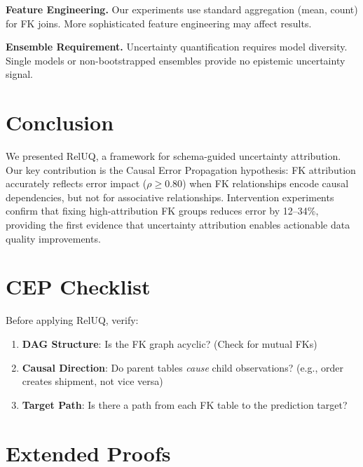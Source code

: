 \documentclass{article}
\begin{document}
\textbf{Feature Engineering.}
Our experiments use standard aggregation (mean, count) for FK joins. More sophisticated
feature engineering may affect results.

\textbf{Ensemble Requirement.}
Uncertainty quantification requires model diversity. Single models or non-bootstrapped
ensembles provide no epistemic uncertainty signal.

\section{Conclusion}

We presented RelUQ, a framework for schema-guided uncertainty attribution. Our key
contribution is the Causal Error Propagation hypothesis: FK attribution accurately
reflects error impact ($\rho \geq 0.80$) when FK relationships encode causal dependencies,
but not for associative relationships. Intervention experiments confirm that fixing
high-attribution FK groups reduces error by 12--34\%, providing the first evidence
that uncertainty attribution enables actionable data quality improvements.




\newpage
\appendix

\section{CEP Checklist}
\label{app:checklist}

Before applying RelUQ, verify:
\begin{enumerate}
    \item \textbf{DAG Structure}: Is the FK graph acyclic? (Check for mutual FKs)
    \item \textbf{Causal Direction}: Do parent tables \emph{cause} child observations?
    (e.g., order creates shipment, not vice versa)
    \item \textbf{Target Path}: Is there a path from each FK table to the prediction target?
\end{enumerate}

\section{Extended Proofs}
\label{app:proofs}
\end{document}
